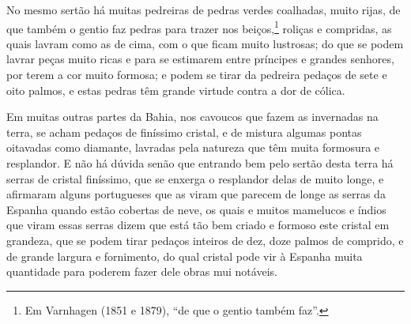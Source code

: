 No mesmo sertão há muitas pedreiras de pedras verdes coalhadas, muito rijas, de que também
o gentio faz pedras para trazer nos beiços,\footnote{ Em Varnhagen (1851 e 1879), ``de que
o gentio também faz''.} roliças e compridas, as quais lavram como as de cima, com o que
ficam muito lustrosas; do que se podem lavrar peças muito ricas e para se estimarem entre
príncipes e grandes senhores, por terem a cor muito formosa; e podem se tirar da pedreira
pedaços de sete e oito palmos, e estas pedras têm grande virtude contra a dor de cólica.

Em muitas outras partes da Bahia, nos cavoucos que fazem as invernadas na terra, se acham
pedaços de finíssimo cristal, e de mistura algumas pontas oitavadas como diamante,
lavradas pela natureza que têm muita formosura e resplandor. E não há dúvida senão que
entrando bem pelo sertão desta terra há serras de cristal finíssimo, que se enxerga o
resplandor delas de muito longe, e afirmaram alguns portugueses que as viram que parecem
de longe as serras da Espanha quando estão cobertas de neve, os quais e muitos mamelucos e
índios que viram essas serras dizem que está tão bem criado e formoso este cristal em
grandeza, que se podem tirar pedaços inteiros de dez, doze palmos de comprido, e de grande
largura e fornimento, do qual cristal pode vir à Espanha muita quantidade para poderem
fazer dele obras mui notáveis.

